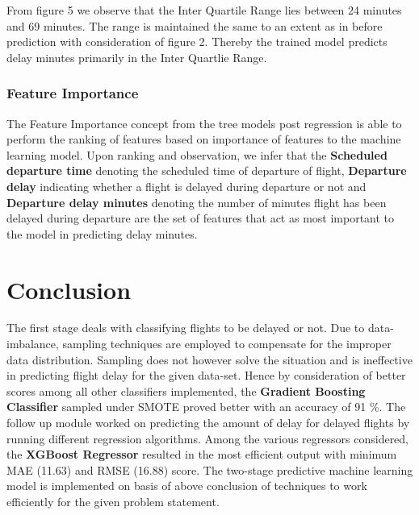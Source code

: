 \documentclass{article}
\begin{document}
From figure 5 we observe that the Inter Quartile Range lies between 24 minutes and 69 minutes. The range is maintained the same to an extent as in before prediction with consideration of figure 2. Thereby the trained model predicts delay minutes primarily in the Inter Quartlie Range.

\subsubsection{Feature Importance}

The Feature Importance concept from the tree models post regression is able to perform the ranking of features based on importance of features to the machine learning model. 
Upon ranking and observation, we infer that the \textbf{Scheduled departure time} denoting the scheduled time of departure of flight, \textbf{Departure delay} indicating whether a flight is delayed during departure or not and \textbf{Departure delay minutes} denoting the number of minutes flight has been delayed during departure are the set of features that act as most important to the model in predicting delay minutes.

\section{Conclusion}

 The first stage deals with classifying flights to be delayed or not. Due to data-imbalance, sampling techniques are employed to compensate for the improper data distribution. Sampling does not however solve the situation and is ineffective in predicting flight delay for the given data-set. Hence by consideration of better scores among all other classifiers implemented, the \textbf{Gradient Boosting Classifier} sampled under SMOTE proved better with an accuracy of 91 \%\/. The follow up module worked on predicting the amount of delay for delayed flights by running different regression algorithms. Among the various regressors considered, the \textbf{XGBoost Regressor} resulted in the most efficient output with minimum MAE (11.63) and RMSE (16.88) score. The two-stage predictive machine learning model is implemented on basis of above conclusion of techniques to work efficiently for the given problem statement.
\end{document}
